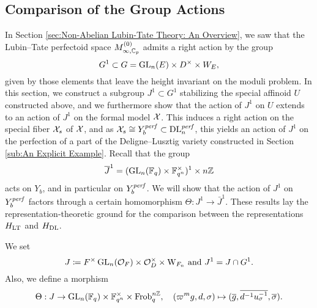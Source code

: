 \documentclass[../main.tex]{subfiles}
\begin{document}
\subsection{Comparison of the Group Actions} %
\label{sub:Proof of Proposition}
In Section \ref{sec:Non-Abelian Lubin-Tate Theory: An Overview}, we saw that
the Lubin--Tate perfectoid space $M_{\infty, \mathbb{C}_p}^{(0)}$ admits a right action
by the group
\begin{equation*}
  G^1 \subset G = \operatorname{GL}_n(E) \times D^\times \times W_E,
\end{equation*}
given by those elements that leave the height invariant on the moduli problem.
In this section, we construct a subgroup $J^1 \subset G^1$ stabilizing the
special affinoid $U$ constructed above, and we furthermore show that 
the action of $J^1$ on $U$ extends to an action of $J^1$ on the formal model
$\mathcal{X}$. This induces a right action on the special fiber
$\mathcal{X}_s$ of $\mathcal{X}$, and as $\mathcal{X}_s \cong Y_b^{\mathit{perf}} \subset \mathrm{DL}_n^{\mathit{perf}}$, this
yields an action of $J^1$ on the perfection of a part of the Deligne--Lusztig
variety constructed in Section \ref{sub:An Explicit Example}. Recall that the group 
\begin{equation*}
  \overline J^1 = (\operatorname{GL}_n(\mathbb{F}_q) \times \mathbb{F}_{q^n}^\times)^1 \times n\mathbb{Z}
\end{equation*}
acts on $Y_b$, and in particular on 
$Y_b^{\mathit{perf}}$. We will show that the action of $J^1$ on $Y_b^{\mathit{perf}}$
factors through a certain homomorphism $\Theta: J^1 \to \bar J^1$. These
results lay the representation-theoretic ground for the comparison between the
representations $H_{\mathrm{LT}}$ and $H_\mathrm{DL}$.

We set 
\begin{equation} \label{eq:defJandJ1}
  J \coloneqq F^\times \operatorname{GL}_n(\mathcal{O}_F) \times \mathcal{O}_D^\times \times \mathrm W_{F_n}
  \text{ and } J^1 = J \cap G^1.
\end{equation}
Also, we define a morphism 
\begin{equation*}
  \Theta: J \to \operatorname{GL}_n(\mathbb{F}_q) \times \mathbb{F}_{q^n}^\times \times {\mathrm{Frob}_q^{n\mathbb{Z}}}, \quad
  (\varpi^m g,d,\sigma) \mapsto (\overline g, \overline {d^{-1}u_\sigma^{-1}}, \overline{\sigma}).
\end{equation*}
\end{document}
